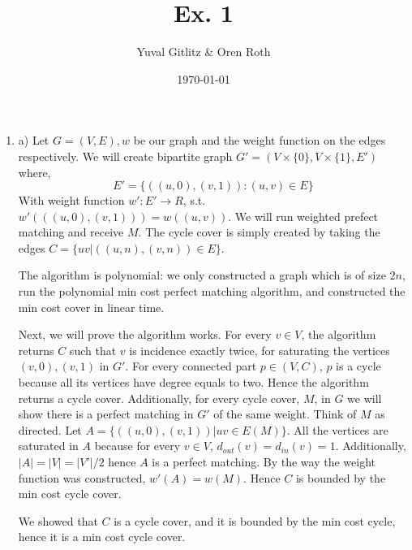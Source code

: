 \documentclass{article}
\title{Ex. 1}
\author{Yuval Gitlitz \& Oren Roth}
\date{\today}
\begin{document}
\maketitle

\begin{enumerate}
	\item
a) Let $G=(V,E),w$ be our graph and the weight function on the edges respectively. We will create bipartite graph $G'=(V\times \{0\},V\times \{1\},E')$ where,
$$E' = \{((u,0),(v,1)): (u,v)\in E \}$$
With weight function $w':E'\rightarrow R$, s.t. $w'(((u,0),(v,1))) = w((u,v))$.
We will run weighted prefect matching and receive $M$.
The cycle cover is simply created by taking the edges $C = \{uv | ((u, n), (v, n)) \in E\}$.

The algorithm is polynomial: we only constructed a graph which is of size $2n$, run the polynomial min cost perfect matching algorithm, and constructed the min cost cover in linear time.

Next, we will prove the algorithm works. For every $v \in V$, the algorithm returns $C$ such that $v$ is incidence exactly twice, for saturating the vertices $(v, 0), (v, 1)$ in $G'$. For every connected part $p \in (V, C)$, $p$ is a cycle because all its vertices have degree equals to two. Hence the algorithm returns a cycle cover. Additionally, for every cycle cover, $M$, in $G$ we will show there is a perfect matching in $G'$ of the same weight. Think of $M$ as directed.
Let $A = \{((u, 0), (v, 1)) | uv \in E(M)\}$. All the vertices are saturated in $A$ because for every $v \in V$, $d_{out}(v) = d_{in}(v) = 1$. Additionally, $|A| = |V| = |V'| / 2$ hence $A$ is a perfect matching. By the way the weight function was constructed, $w'(A) = w(M)$. Hence $C$ is bounded by the min cost cycle cover.

We showed that $C$ is a cycle cover, and it is bounded by the min cost cycle, hence it is a min cost cycle cover.


\end{enumerate}
\end{document}
